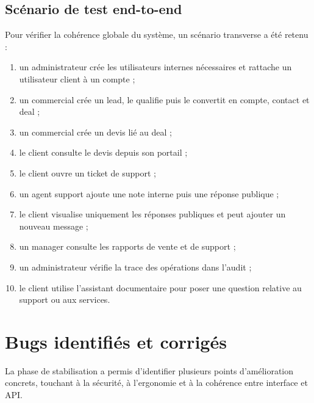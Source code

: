 \subsection{Scénario de test end-to-end}
Pour vérifier la cohérence globale du système, un scénario transverse a été retenu :
\begin{enumerate}
    \item un administrateur crée les utilisateurs internes nécessaires et rattache un utilisateur client à un compte ;
    \item un commercial crée un lead, le qualifie puis le convertit en compte, contact et deal ;
    \item un commercial crée un devis lié au deal ;
    \item le client consulte le devis depuis son portail ;
    \item le client ouvre un ticket de support ;
    \item un agent support ajoute une note interne puis une réponse publique ;
    \item le client visualise uniquement les réponses publiques et peut ajouter un nouveau message ;
    \item un manager consulte les rapports de vente et de support ;
    \item un administrateur vérifie la trace des opérations dans l'audit ;
    \item le client utilise l'assistant documentaire pour poser une question relative au support ou aux services.
\end{enumerate}

\section{Bugs identifiés et corrigés}
La phase de stabilisation a permis d'identifier plusieurs points d'amélioration concrets, touchant à la sécurité, à l'ergonomie et à la cohérence entre interface et API.

